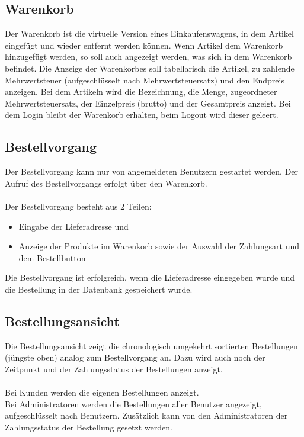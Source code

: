 \documentclass[a4paper,oneside,12pt]{scrartcl}
\begin{document}
\subsection{Warenkorb}
Der Warenkorb ist die virtuelle Version eines Einkaufenswagens, in dem Artikel eingefügt und
wieder entfernt werden können. Wenn Artikel dem Warenkorb hinzugefügt werden,
so soll auch angezeigt werden, was sich in dem Warenkorb befindet.
Die Anzeige der Warenkorbes soll tabellarisch die Artikel, zu zahlende Mehrwertsteuer (aufgeschlüsselt nach Mehrwertsteuersatz) 
und den Endpreis anzeigen.
Bei dem Artikeln wird die Bezeichnung, die Menge, zugeordneter Mehrwertsteuersatz, der Einzelpreis (brutto) und
der Gesamtpreis anzeigt. Bei dem Login bleibt der Warenkorb erhalten, beim Logout wird dieser geleert.

\subsection{Bestellvorgang}
Der Bestellvorgang kann nur von angemeldeten Benutzern gestartet werden.
Der Aufruf des Bestellvorgangs erfolgt über den Warenkorb.\\
\\
Der Bestellvorgang besteht aus 2 Teilen:
\begin{itemize}
  \item Eingabe der Lieferadresse und
  \item Anzeige der Produkte im Warenkorb sowie der Auswahl der Zahlungsart und dem Bestellbutton
 \end{itemize}
Die Bestellvorgang ist erfolgreich, wenn die Lieferadresse eingegeben wurde und die
Bestellung in der Datenbank gespeichert wurde.

\subsection{Bestellungsansicht}
Die Bestellungsansicht zeigt die chronologisch umgekehrt sortierten Bestellungen (jüngste oben) analog zum Bestellvorgang an.
Dazu wird auch noch der Zeitpunkt und der Zahlungsstatus der Bestellungen anzeigt.\\
\\
Bei Kunden werden die eigenen Bestellungen anzeigt.\\
Bei Administratoren werden die Bestellungen aller Benutzer angezeigt, aufgeschlüsselt nach Benutzern. Zusätzlich kann von den Administratoren der 
Zahlungsstatus der Bestellung gesetzt werden.
\end{document}
